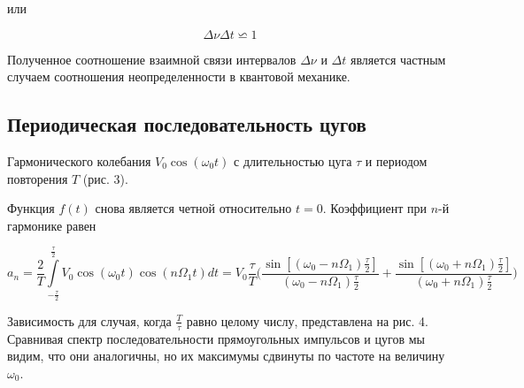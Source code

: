 \documentclass[a4paper, 14pt]{extarticle}%
\begin{document}
	 или 
	
\begin{equation}\label{neopr}
	\Delta \nu \Delta t \backsimeq 1
\end{equation}
		
	Полученное соотношение взаимной связи интервалов $\Delta \nu$ и $\Delta t$ является
	частным случаем соотношения неопределенности в квантовой механике.
	
	\subsection{Периодическая последовательность цугов} 
	Гармонического колебания $V_{0}\cos(\omega_{0}t)$ с длительностью цуга $\tau$ и периодом повторения $T$ (рис. 3).
	
	Функция $f(t)$ снова является четной относительно $t=0$. Коэффициент при $n$-й гармонике равен
	
	$$a_{n}=\dfrac{2}{T}\int\limits_{-\frac{\tau}{2}}^{\frac{\tau}{2}}V_{0}\cos(\omega_{0}t)\cos(n \Omega_{1} t)dt=V_{0}\dfrac{\tau}{T} \bigg(\dfrac{\sin[(\omega_{0}-n\Omega_{1})\frac{\tau}{2}]}{(\omega_{0}-n\Omega_{1})\frac{\tau}{2}}+\dfrac{\sin[(\omega_{0}+n\Omega_{1})\frac{\tau}{2}]}{(\omega_{0}+n\Omega_{1})\frac{\tau}{2}} \bigg)$$ 
	
	Зависимость для случая, когда $\frac{T}{\tau}$ равно целому числу, представлена на рис. 4. Сравнивая спектр последовательности прямоугольных импульсов и цугов мы видим, что они аналогичны, но их максимумы сдвинуты по частоте на величину $\omega_{0}$.
	
\end{document}
